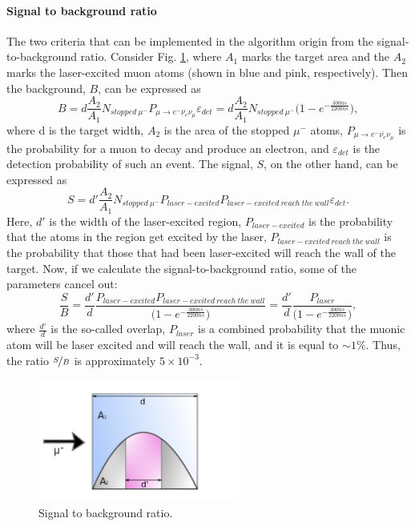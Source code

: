 \documentclass[12pt]{article}
\begin{document}
\paragraph{Signal to background ratio}
The two criteria that can be implemented in the algorithm origin from the signal-to-background ratio. Consider Fig. \ref{fig:diffusion}, where $A_1$ marks the target area and the $A_2$ marks the laser-excited muon atoms (shown in blue and pink, respectively). Then the background, $B$, can be expressed as
\begin{equation}
B= d \frac{A_2}{A_1}  N_{stopped\: {\mu}^-} P_{\mu \rightarrow {e^-}\overline{{\nu}_e}{\nu}_{\mu}} \varepsilon_{det} = d \frac{A_2}{A_1} N_{stopped\: {\mu}^-}  \Big(1 - e^{-\frac{300ns}{2200ns}}\Big),
\end{equation}
where d is the target width, $A_2$ is the area of the stopped ${\mu}^-$ atoms, $P_{\mu \rightarrow {e^-}\overline{{\nu}_e}{\nu}_{\mu}}$ is the probability for a muon to decay and produce an electron, and $\varepsilon_{det}$ is the detection probability of such an event. The signal, $S$, on the other hand, can be expressed as
\begin{equation}
S = d' \frac{A_2}{A_1} N_{stopped\: {\mu}^-} P_{laser-excited} P_{laser-excited\: reach\: the\: wall} \varepsilon_{det}.
\end{equation}
Here, $d'$ is the width of the laser-excited region, $P_{laser-excited}$ is the probability that the atoms in the region get excited by the laser, $P_{laser-excited\: reach\: the\: wall}$ is the probability that those that had been laser-excited will reach the wall of the target. Now, if we calculate the signal-to-background ratio, some of the parameters cancel out:
\begin{equation}
\frac{S}{B} = \frac{d'}{d} \frac{{P_{laser-excited}}{P_{laser-excited\: reach\: the\: wall}}}{ \Big(1 - e^{-\frac{300ns}{2200ns}}\Big)} = \frac{d'}{d} \frac{P_{laser}}{\Big(1 - e^{-\frac{300ns}{2200ns}}\Big)},
\end{equation}
where $\frac{d'}{d}$ is the so-called overlap, $P_{laser}$ is a combined probability that the muonic atom will be laser excited and will reach the wall, and it is equal to $\sim 1 \%$. Thus, the ratio $\nicefrac{S}{B}$ is approximately $5 \times 10^{-3}$.
\begin{figure}[!htbp]
\centering
\includegraphics[width=0.6\textwidth]{img/diffusion2.png}
\caption{Signal to background ratio.}
\label{fig:diffusion}
\end{figure}
\end{document}

